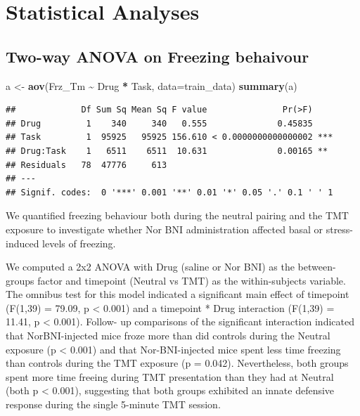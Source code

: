 \documentclass[
]{book}
\newenvironment{Shaded}{\begin{snugshade}}{\end{snugshade}}
\newcommand{\AttributeTok}[1]{\textcolor[rgb]{0.13,0.29,0.53}{#1}}
\newcommand{\FunctionTok}[1]{\textcolor[rgb]{0.13,0.29,0.53}{\textbf{#1}}}
\newcommand{\NormalTok}[1]{#1}
\newcommand{\OtherTok}[1]{\textcolor[rgb]{0.56,0.35,0.01}{#1}}
\newcommand{\SpecialCharTok}[1]{\textcolor[rgb]{0.81,0.36,0.00}{\textbf{#1}}}
\begin{document}
\hypertarget{statistical-analyses}{%
\section{Statistical Analyses}\label{statistical-analyses}}

\hypertarget{two-way-anova-on-freezing-behaivour}{%
\subsection{Two-way ANOVA on Freezing behaivour}\label{two-way-anova-on-freezing-behaivour}}

\begin{Shaded}
\begin{Highlighting}[]
\NormalTok{a }\OtherTok{\textless{}{-}} \FunctionTok{aov}\NormalTok{(Frz\_Tm }\SpecialCharTok{\textasciitilde{}}\NormalTok{ Drug }\SpecialCharTok{*}\NormalTok{ Task, }\AttributeTok{data=}\NormalTok{train\_data)}
\FunctionTok{summary}\NormalTok{(a)}
\end{Highlighting}
\end{Shaded}

\begin{verbatim}
##             Df Sum Sq Mean Sq F value               Pr(>F)    
## Drug         1    340     340   0.555              0.45835    
## Task         1  95925   95925 156.610 < 0.0000000000000002 ***
## Drug:Task    1   6511    6511  10.631              0.00165 ** 
## Residuals   78  47776     613                                 
## ---
## Signif. codes:  0 '***' 0.001 '**' 0.01 '*' 0.05 '.' 0.1 ' ' 1
\end{verbatim}

We quantified freezing behaviour both during the neutral pairing and the TMT exposure to investigate whether Nor BNI administration affected basal or stress-induced levels of freezing.

We computed a 2x2 ANOVA with Drug (saline or Nor BNI) as the between-groups factor and timepoint (Neutral vs TMT) as the within-subjects variable. The omnibus test for this model indicated a significant main effect of timepoint (F(1,39) = 79.09, p \textless{} 0.001) and a timepoint * Drug interaction (F(1,39) = 11.41, p \textless{} 0.001). Follow- up comparisons of the significant interaction indicated that NorBNI-injected mice froze more than did controls during the Neutral exposure (p \textless{} 0.001) and that Nor-BNI-injected mice spent less time freezing than controls during the TMT exposure (p = 0.042). Nevertheless, both groups spent more time freeing during TMT presentation than they had at Neutral (both p \textless{} 0.001), suggesting that both groups exhibited an innate defensive response during the single 5-minute TMT session.
\end{document}
